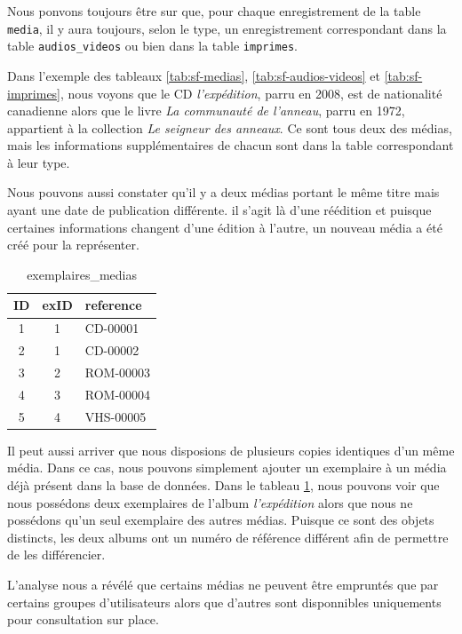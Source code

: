 \documentclass[letter, 11pt]{report}
\begin{document}
Nous ponvons toujours être sur que, pour chaque enregistrement de la table \texttt{media}, il y aura toujours, selon le type, un enregistrement correspondant dans la table \texttt{audios\_videos} ou bien dans la table \texttt{imprimes}.

Dans l'exemple des tableaux \ref{tab:sf-medias}, \ref{tab:sf-audios-videos} et \ref{tab:sf-imprimes}, nous voyons que le CD \emph{l'expédition}, parru en 2008, est de nationalité canadienne alors que le livre \emph{La communauté de l'anneau}, parru en 1972, appartient à la collection \emph{Le seigneur des anneaux}. Ce sont tous deux des médias, mais les informations supplémentaires de chacun sont dans la table correspondant à leur type.

Nous pouvons aussi constater qu'il y a deux médias portant le même titre mais ayant une date de publication différente. il s'agit là d'une réédition et puisque certaines informations changent d'une édition à l'autre, un nouveau média a été créé pour la représenter.

\begin{table}[htbp]
	\caption{exemplaires\_medias}
	\label{tab:sf-exemplaires-medias}
	\begin{center}
		\begin{tabular}{|c|c|l|}
			\hline
			ID & exID & reference \\
			\hline
			1  & 1    & CD-00001 \\
			2  & 1    & CD-00002 \\
			3  & 2    & ROM-00003 \\
			4  & 3    & ROM-00004 \\
			5  & 4    & VHS-00005 \\
			\hline
		\end{tabular}
	\end{center}
\end{table}

Il peut aussi arriver que nous disposions de plusieurs copies identiques d'un même média. Dans ce cas, nous pouvons simplement ajouter un exemplaire à un média déjà présent dans la base de données. Dans le tableau \ref{tab:sf-exemplaires-medias}, nous pouvons voir que nous possédons deux exemplaires de l'album \emph{l'expédition} alors que nous ne possédons qu'un seul exemplaire des autres médias. Puisque ce sont des objets distincts, les deux albums ont un numéro de référence différent afin de permettre de les différencier.

L'analyse nous a révélé que certains médias ne peuvent être empruntés que par certains groupes d'utilisateurs alors que d'autres sont disponnibles uniquements pour consultation sur place.
\end{document}
